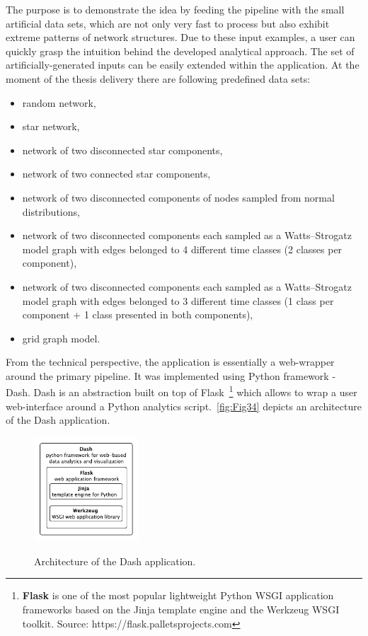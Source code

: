 The purpose is to demonstrate the idea by feeding the pipeline with the small artificial data sets, which are not only very fast to process but also exhibit extreme patterns of network structures. Due to these input examples, a user can quickly grasp the intuition behind the developed analytical approach. The set of artificially-generated inputs can be easily extended within the application. At the moment of the thesis delivery there are following predefined data sets:
    \begin{itemize}
        \item random network,
        \item star network,
        \item network of two disconnected star components,
        \item network of two connected star components,
        \item network of two disconnected components of nodes sampled from normal distributions,
        \item network of two disconnected components each sampled as a Watts–Strogatz model graph with edges belonged to 4 different time classes (2 classes per component),
        \item network of two disconnected components each sampled as a Watts–Strogatz model graph with edges belonged to 3 different time classes (1 class per component + 1 class presented in both components),
        \item grid graph model.
    \end{itemize}

From the technical perspective, the application is essentially a web-wrapper around the primary pipeline. It was implemented using Python framework - Dash. Dash is an abstraction built on top of Flask~\footnote{\textbf{Flask} is one of the most popular lightweight Python WSGI application frameworks based on the Jinja template engine and the Werkzeug WSGI toolkit. Source: https://flask.palletsprojects.com} which allows to wrap a user web-interface around a Python analytics script.~\autoref{fig:Fig34} depicts an architecture of the Dash application.

\begin{figure}[!ht]
	\centering
	\includegraphics[width=0.35\textwidth]{images/Fig34.pdf}\\
	\caption{Architecture of the Dash application.}
	\label{fig:Fig34}
\end{figure}

